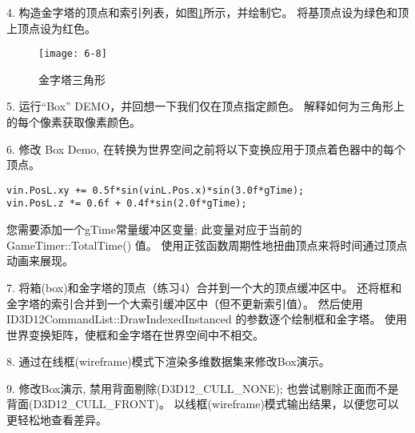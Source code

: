 \begin{flushleft}
4. 构造金字塔的顶点和索引列表，如图\ref{fig:6-8}所示，并绘制它。 将基顶点设为绿色和顶上顶点设为红色。\\
\end{flushleft}
\begin{figure}[h]
    \texttt{[image: 6-8]}
    \centering
    \caption{金字塔三角形}
    \label{fig:6-8}
\end{figure}
\begin{flushleft}
5. 运行“Box” DEMO，并回想一下我们仅在顶点指定颜色。 解释如何为三角形上的每个像素获取像素颜色。
\end{flushleft}


\begin{flushleft}
6. 修改 Box Demo, 在转换为世界空间之前将以下变换应用于顶点着色器中的每个顶点。
\end{flushleft}
\begin{lstlisting}
vin.PosL.xy += 0.5f*sin(vinL.Pos.x)*sin(3.0f*gTime);
vin.PosL.z *= 0.6f + 0.4f*sin(2.0f*gTime);
\end{lstlisting}
\begin{flushleft}
您需要添加一个gTime常量缓冲区变量; 此变量对应于当前的 GameTimer::TotalTime() 值。 使用正弦函数周期性地扭曲顶点来将时间通过顶点动画来展现。
\end{flushleft}

\begin{flushleft}
7. 将箱(box)和金字塔的顶点（练习4）合并到一个大的顶点缓冲区中。 还将框和金字塔的索引合并到一个大索引缓冲区中（但不更新索引值）。 然后使用 ID3D12CommandList::DrawIndexedInstanced 的参数逐个绘制框和金字塔。 使用世界变换矩阵，使框和金字塔在世界空间中不相交。
\end{flushleft}

\begin{flushleft}
8. 通过在线框(wireframe)模式下渲染多维数据集来修改Box演示。
\end{flushleft}

\begin{flushleft}
9. 修改Box演示, 禁用背面剔除(D3D12\_CULL\_NONE); 也尝试剔除正面而不是背面(D3D12\_CULL\_FRONT)。 以线框(wireframe)模式输出结果，以便您可以更轻松地查看差异。
\end{flushleft}

